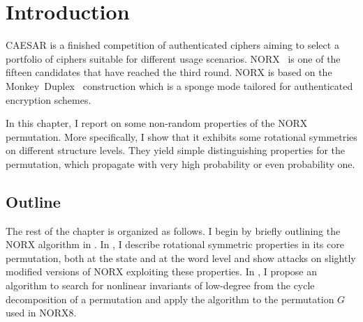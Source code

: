 \section{Introduction}
\label{sec:intro}

CAESAR is a finished competition of authenticated ciphers aiming to select a portfolio of ciphers suitable for different usage scenarios. NORX~\cite{NORX} is one of the fifteen candidates that have reached the third round. NORX is based on the Monkey~Duplex~\cite{Bertoni2012,Bertoni12} construction which is a sponge mode tailored for authenticated encryption schemes.

In this chapter, I report on some non-random properties of the NORX permutation. More specifically, I show that it exhibits some rotational symmetries on different structure levels. They yield simple distinguishing properties for the permutation, which propagate with very high probability or even probability one.

\subsection{Outline}
The rest of the chapter is organized as follows. I begin by briefly outlining the NORX algorithm in . In , I describe rotational symmetric properties in its core permutation, both at the state and at the word level and show attacks on slightly modified versions of NORX exploiting these properties. In , I propose an algorithm to search for nonlinear invariants of low-degree from the cycle decomposition of a permutation and apply the algorithm to the permutation $G$ used in NORX8.